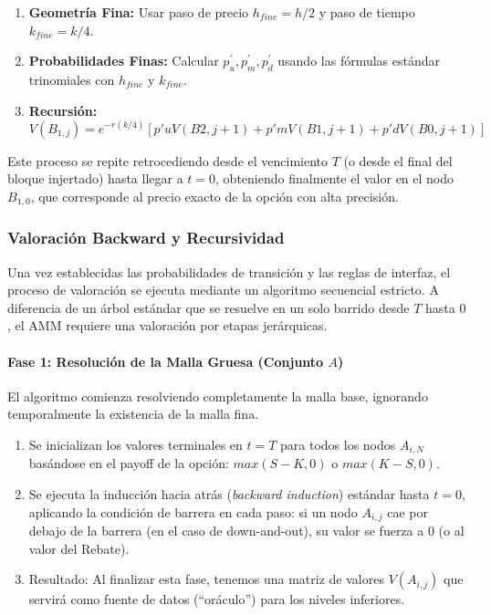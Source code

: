 \begin{enumerate} 
  \item \textbf{Geometría Fina:} Usar paso de precio $h_{fine}=h/2$ y paso de tiempo $k_{fine}=k/4$.
  
  \item \textbf{Probabilidades Finas:} Calcular $p_u^\prime,p_m^\prime, p_d^\prime$ usando las fórmulas estándar trinomiales con $h_{fine}$ y $k_{fine}$.

  \item \textbf{Recursión:} 
  \begin{equation} 
    V(B_{1,j}) = e^{-r(k/4)} \left[ p'u V(B{2, j+1}) + p'm V(B{1, j+1}) + p'd V(B{0, j+1}) \right] 
  \end{equation}
\end{enumerate}

Este proceso se repite retrocediendo desde el vencimiento $T$ (o desde el final del bloque injertado) hasta llegar a $t=0$, obteniendo finalmente el valor en el nodo $B_{1,0}$, que corresponde al precio exacto de la opción con alta precisión.

\subsubsection{Valoración Backward y Recursividad}

Una vez establecidas las probabilidades de transición y las reglas de interfaz, el proceso de valoración se ejecuta mediante un algoritmo secuencial estricto. A diferencia de un árbol estándar que se resuelve en un solo barrido desde $T$ hasta $0$, el AMM requiere una valoración por etapas jerárquicas.

\paragraph{Fase 1: Resolución de la Malla Gruesa (Conjunto $A$)} 

El algoritmo comienza resolviendo completamente la malla base, ignorando temporalmente la existencia de la malla fina. 

\begin{enumerate} 
  \item Se inicializan los valores terminales en $t=T$ para todos los nodos $A_{i,N}$ basándose en el payoff de la opción: $max(S-K,0)$ o $max(K-S,0)$. 
  
  \item Se ejecuta la inducción hacia atrás (\textit{backward induction}) estándar hasta $t=0$, aplicando la condición de barrera en cada paso: si un nodo $A_{i,j}$ cae por debajo de la barrera (en el caso de down-and-out), su valor se fuerza a $0$ (o al valor del Rebate). 
  
  \item Resultado: Al finalizar esta fase, tenemos una matriz de valores $V(A_{i,j})$ que servirá como fuente de datos (``oráculo'') para los niveles inferiores. 
\end{enumerate}

